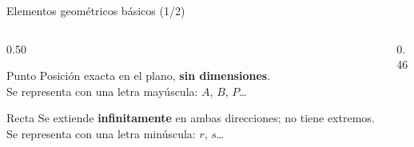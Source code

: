 \documentclass[aspectratio=169, 10pt, spanish]{beamer}
\begin{document}
\begin{frame}{Elementos geométricos básicos (1/2)}
  \begin{columns}[T]
    \begin{column}{0.50\textwidth}
      \begin{definicionbox}{Punto}
        \AlmFontFootnote
        Posición exacta en el plano, \textbf{sin dimensiones}.\\
        Se representa con una letra mayúscula: $A$, $B$, $P$\ldots
      \end{definicionbox}
      \vspace{5pt}
      \begin{definicionbox}{Recta}
        \AlmFontFootnote
        Se extiende \textbf{infinitamente} en ambas direcciones;
        no tiene extremos. Se representa con una letra minúscula: $r$, $s$\ldots
      \end{definicionbox}
    \end{column}
    \begin{column}{0.46\textwidth}
      \begin{center}
      \end{center}
    \end{column}
  \end{columns}
\end{frame}
\end{document}
